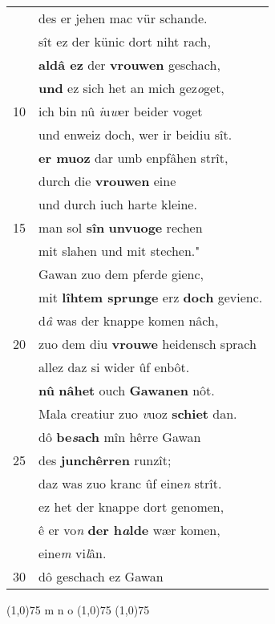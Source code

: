 \documentclass[8pt,a4paper,notitlepage]{article}
\begin{document}
\begin{table}[ht]
\begin{minipage}[t]{0.5\linewidth}
\begin{tabular}{rl}
 & des er jehen mac vür schande.\\ 
 & sît ez der künic dort niht rach,\\ 
 & \textbf{aldâ ez} der \textbf{vrouwen} geschach,\\ 
 & \textbf{und} ez sich het an mich gez\textit{o}get,\\ 
10 & ich bin nû \textit{i}u\textit{w}er beider voget\\ 
 & und enweiz doch, wer ir beidiu sît.\\ 
 & \textbf{er muoz} dar umb enpfâhen strît,\\ 
 & durch die \textbf{vrouwen} eine\\ 
 & und durch iuch harte kleine.\\ 
15 & man sol \textbf{sîn} \textbf{unvuoge} rechen\\ 
 & mit slahen und mit stechen."\\ 
 & Gawan zuo dem pferde gienc,\\ 
 & mit \textbf{lîhtem sprunge} erz \textbf{doch} gevienc.\\ 
 & d\textit{â} was der knappe komen nâch,\\ 
20 & zuo dem diu \textbf{vrouwe} heidensch sprach\\ 
 & allez daz si wider ûf enbôt.\\ 
 & \textbf{nû} \textbf{nâhet} ouch \textbf{Gawanen} nôt.\\ 
 & Mala creatiur zuo \textit{v}uoz \textbf{schiet} dan.\\ 
 & dô \textbf{be\textit{s}ach} mîn hêrre Gawan\\ 
25 & des \textbf{junchêrren} runzît;\\ 
 & daz was zuo kranc ûf eine\textit{n} strît.\\ 
 & ez het der knappe dort genomen,\\ 
 & ê er vo\textit{n} \textbf{der h\textit{a}lde} wær komen,\\ 
 & eine\textit{m} vi\textit{l}ân.\\ 
30 & dô geschach ez Gawan\\ 
\end{tabular}
\scriptsize
\line(1,0){75} \newline
m n o \newline
\line(1,0){75} \newline
\newline
\line(1,0){75} \newline

\end{minipage}
\end{table}
\end{document}
